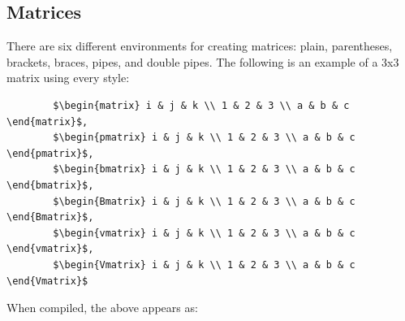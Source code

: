 \documentclass[]{article}
\newcommand{\dent}{\hspace{\parindent}} %
\begin{document}
    \subsection{Matrices}
    \dent There are six different environments for creating matrices: plain, parentheses, brackets, braces, pipes, and double pipes. The following is an example of a 3x3 matrix using every style:
    \begin{verbatim}
        $\begin{matrix} i & j & k \\ 1 & 2 & 3 \\ a & b & c \end{matrix}$, 
        $\begin{pmatrix} i & j & k \\ 1 & 2 & 3 \\ a & b & c \end{pmatrix}$, 
        $\begin{bmatrix} i & j & k \\ 1 & 2 & 3 \\ a & b & c \end{bmatrix}$, 
        $\begin{Bmatrix} i & j & k \\ 1 & 2 & 3 \\ a & b & c \end{Bmatrix}$, 
        $\begin{vmatrix} i & j & k \\ 1 & 2 & 3 \\ a & b & c \end{vmatrix}$, 
        $\begin{Vmatrix} i & j & k \\ 1 & 2 & 3 \\ a & b & c \end{Vmatrix}$
    \end{verbatim}
    When compiled, the above appears as: \\
\end{document}
